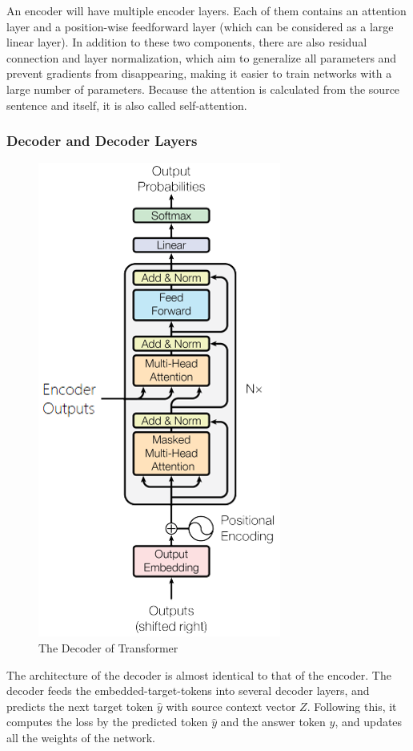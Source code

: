 An encoder will have multiple encoder layers. Each of them contains an attention layer and a position-wise feedforward layer (which can be considered as a large linear layer). In addition to these two components, there are also residual connection and layer normalization, which aim to generalize all parameters and prevent gradients from disappearing, making it easier to train networks with a large number of parameters. Because the attention is calculated from the source sentence and itself, it is also called self-attention. 

\subsubsection{Decoder and Decoder Layers}

\begin{figure}[h]
	\centering
	\includegraphics{../images/transformer-decoder.png}
    \caption{The Decoder of Transformer}
	\label{fig:transformer_decoder}
\end{figure}

The architecture of the decoder is almost identical to that of the encoder. The decoder feeds the embedded-target-tokens into several decoder layers, and predicts the next target token $\hat{y}$ with source context vector $Z$. Following this, it computes the loss by the predicted token $\hat{y}$ and the answer token $y$, and updates all the weights of the network.

